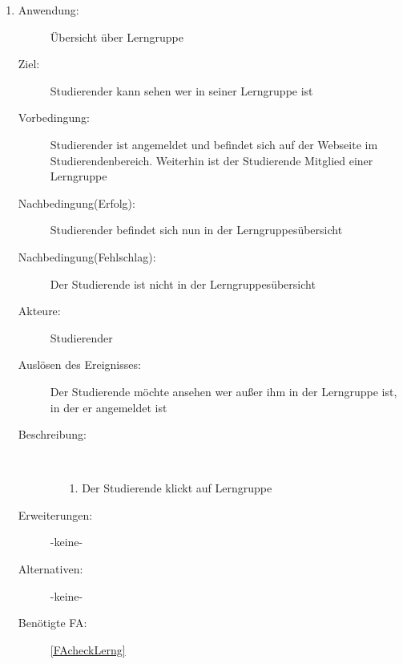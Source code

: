 \documentclass[parskip=full]{scrartcl}
\newcommand{\swtLabel}[1]{\textbf{/#1\arabic*0/}}
\begin{document}
\begin{enumerate}[label=\swtLabel{S}]
   \item \label{UCstudUebersichtLernG}
  \begin{description}
  \item[Anwendung:] Übersicht über \gls{Lerngruppe}
  \item[Ziel:] Studierender kann sehen wer in seiner \gls{Lerngruppe} ist
  	\item[Vorbedingung:] Studierender ist angemeldet und befindet sich auf der
  	Webseite im Studierendenbereich. Weiterhin ist der Studierende Mitglied einer
  	\gls{Lerngruppe}
  	\item[Nachbedingung(Erfolg):] Studierender befindet sich nun in der
  	\glspl{Lerngruppe}übersicht
  	\item[Nachbedingung(Fehlschlag):] Der Studierende ist nicht in der
  	\glspl{Lerngruppe}übersicht
  	\item[Akteure:] Studierender
  	\item[Auslösen des Ereignisses:] Der Studierende möchte ansehen wer außer ihm
  	in der \gls{Lerngruppe} ist, in der er angemeldet ist
  	\item[Beschreibung:]~
  	\begin{enumerate}
  	  \item[1.] Der Studierende klickt auf \gls{Lerngruppe} %
 
  	\end{enumerate}
  	\item[Erweiterungen:] -keine-
  	
  	\item[Alternativen:] -keine-
  	
  	 \item[Benötigte FA:] \ref{FAcheckLerng}
  \end{description}
  

\end{enumerate}
\end{document}
